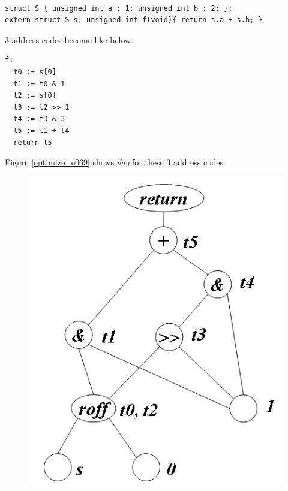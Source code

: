 \begin{Example}
\label{optimize_e068}
\begin{verbatim}

struct S { unsigned int a : 1; unsigned int b : 2; };
extern struct S s; unsigned int f(void){ return s.a + s.b; }
\end{verbatim}
3 address codes become like below.
\begin{verbatim}
f:
  t0 := s[0]
  t1 := t0 & 1
  t2 := s[0]
  t3 := t2 >> 1
  t4 := t3 & 3
  t5 := t1 + t4
  return t5
\end{verbatim}
Figure \ref{optimize_e069} shows {\em dag} for these 3 address codes.
\begin{figure}[htbp]
\begin{center}
\begin{htmlonly}
\includegraphics[width=0.826\linewidth,height=1.0\linewidth]{opt028.png}
\end{htmlonly}
\begin{latexonly}

\end{latexonly}
\end{center}
\end{figure}
\end{Example}
